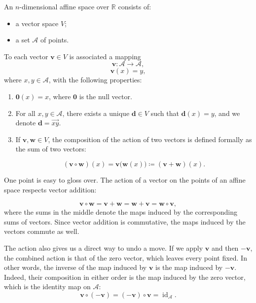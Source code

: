 \documentclass[12pt]{article}
\begin{document}
\begin{definition}

An \(n\)-dimensional affine space over \(\mathbb{R}\) consists of:
\begin{itemize}
    \item a vector space \(V\);
    \item a set \(\mathcal A\) of points.
\end{itemize}

To each vector \(\mathbf{v} \in V\) is associated a mapping
\[
\mathbf{v} \colon \mathcal A \longrightarrow \mathcal A,
\]
\[
\mathbf{v}(x) = y,
\]
where \(x,y \in \mathcal A\), with the following properties:

\begin{enumerate}
    \item
    \(\mathbf{0}(x)=x\), where \(\mathbf{0}\) is the null vector.

    \item
    For all \(x,y\in \mathcal A\), there exists a unique \(\mathbf{d}\in V\)
    such that \(\mathbf{d}(x)=y\), and we denote
    \(\mathbf{d}=\overrightarrow{xy}\).

    \item
    If \(\mathbf{v},\mathbf{w}\in V\), the composition of the action
    of two vectors is defined formally as the sum of two vectors:
    
    \[(\mathbf{v}\circ\mathbf{w})(x)
    =\mathbf{v}\bigl(\mathbf{w}(x)\bigr)
    \coloneqq(\mathbf{v}+\mathbf{w})(x).\]

\end{enumerate}

\end{definition}


One point is easy to gloss over. The action of a vector on the points
of an affine space respects vector addition:

\[
  \mathbf{v}\circ\mathbf{w}
  =
  \mathbf{v}+\mathbf{w}
  =
  \mathbf{w}+\mathbf{v}
  =
  \mathbf{w}\circ\mathbf{v},
\]
where the sums in the middle denote the maps induced by the
corresponding sums of vectors. Since vector addition is commutative,
the maps induced by the vectors commute as well.

The action also gives us a direct way to undo a move. If we apply
$\mathbf{v}$ and then $-\mathbf{v}$, the combined action is that of the
zero vector, which leaves every point fixed. In other words, the inverse of the map induced by $\mathbf{v}$ is the map induced by
$-\mathbf{v}$. Indeed, their composition in either order is the map
induced by the zero vector, which is the identity map on $\mathcal A$:
\[
  \mathbf{v}\circ(-\mathbf{v})
  =
  (-\mathbf{v})\circ\mathbf{v}
  =
  \operatorname{id}_{\mathcal A}.
\]
\end{document}
